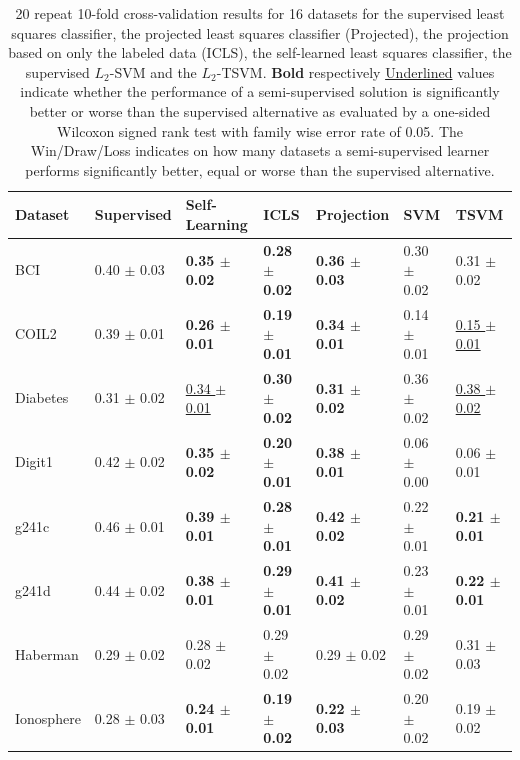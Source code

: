 \documentclass[twoside]{memoir}\usepackage[]{graphicx}\usepackage{xcolor}
\begin{document}
\begin{table}[t]
\center
\caption{20 repeat 10-fold cross-validation results for 16 datasets for the supervised least squares classifier, the projected least squares classifier (Projected), the projection based on only the labeled data (ICLS), the self-learned least squares classifier, the supervised $L_2$-SVM and the $L_2$-TSVM. \textbf{Bold} respectively \underline{Underlined} values indicate whether the performance of a semi-supervised solution is significantly better or worse than the supervised alternative as evaluated by a one-sided Wilcoxon signed rank test with family wise error rate of 0.05. The Win/Draw/Loss indicates on how many datasets a semi-supervised learner performs significantly better, equal or worse than the supervised alternative.} \label{table:crossvalidation-projection}
\label{table:cvresults-projection}
\scriptsize
\begin{tabular}{lllll|ll}
  \toprule
Dataset & Supervised & Self-Learning & ICLS & Projection & SVM & TSVM \\ 
  \midrule
BCI & 0.40 $\pm$ 0.03 & \textbf{0.35 $\pm$ 0.02} & \textbf{0.28 $\pm$ 0.02} & \textbf{0.36 $\pm$ 0.03} & 0.30 $\pm$ 0.02 & 0.31 $\pm$ 0.02 \\ 
  COIL2 & 0.39 $\pm$ 0.01 & \textbf{0.26 $\pm$ 0.01} & \textbf{0.19 $\pm$ 0.01} & \textbf{0.34 $\pm$ 0.01} & 0.14 $\pm$ 0.01 & \underline{0.15 $\pm$ 0.01} \\ 
  Diabetes & 0.31 $\pm$ 0.02 & \underline{0.34 $\pm$ 0.01} & \textbf{0.30 $\pm$ 0.02} & \textbf{0.31 $\pm$ 0.02} & 0.36 $\pm$ 0.02 & \underline{0.38 $\pm$ 0.02} \\ 
  Digit1 & 0.42 $\pm$ 0.02 & \textbf{0.35 $\pm$ 0.02} & \textbf{0.20 $\pm$ 0.01} & \textbf{0.38 $\pm$ 0.01} & 0.06 $\pm$ 0.00 & 0.06 $\pm$ 0.01 \\ 
  g241c & 0.46 $\pm$ 0.01 & \textbf{0.39 $\pm$ 0.01} & \textbf{0.28 $\pm$ 0.01} & \textbf{0.42 $\pm$ 0.02} & 0.22 $\pm$ 0.01 & \textbf{0.21 $\pm$ 0.01} \\ 
  g241d & 0.44 $\pm$ 0.02 & \textbf{0.38 $\pm$ 0.01} & \textbf{0.29 $\pm$ 0.01} & \textbf{0.41 $\pm$ 0.02} & 0.23 $\pm$ 0.01 & \textbf{0.22 $\pm$ 0.01} \\ 
  Haberman & 0.29 $\pm$ 0.02 & 0.28 $\pm$ 0.02 & 0.29 $\pm$ 0.02 & 0.29 $\pm$ 0.02 & 0.29 $\pm$ 0.02 & 0.31 $\pm$ 0.03 \\ 
  Ionosphere & 0.28 $\pm$ 0.03 & \textbf{0.24 $\pm$ 0.01} & \textbf{0.19 $\pm$ 0.02} & \textbf{0.22 $\pm$ 0.03} & 0.20 $\pm$ 0.02 & 0.19 $\pm$ 0.02 \\ 

\end{tabular}
\end{table}
\end{document}
